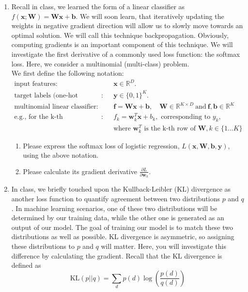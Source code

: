 \documentclass[a4paper]{article}
\begin{document}
\begin{enumerate}
\item Recall in class, we learned the form of a linear classifier as $f(\bm{x}; \bm{W}) =  \bm{W}\bm{x}+\bm{b}$. We will soon learn, that iteratively updating the weights in negative gradient direction will allow us to slowly move towards an optimal solution. We will call this technique backpropagation. Obviously, computing gradients is an important component of this technique. We will investigate the first derivative of a commonly used loss function: the softmax loss. Here, we consider a multinomial (multi-class) problem. \\
We first define the following notation:
\begin{align*}
	\text{input features}: & \quad \bm{x} \in \mathbb{R}^D.\\
	\text{target labels (one-hot encoded)}: & \quad \bm{y} \in \{0,1\}^K.\\
	\text{multinomial linear classifier}: & \quad \bm{f} = \bm{W}\bm{x} + \bm{b}, \quad \bm{W} \in \mathbb{R}^{K \times D}\ \text{and}\ \bm{f}, \bm{b} \in \mathbb{R}^K\\
	\text{e.g., for the k-th classification}: & \quad f_k = \bm{w}_k^T \bm{x} + b_k, \text{ corresponding to } y_k,\\
								&\quad \text{where } \bm{w}^T_k \text{ is the k-th row of } \bm{W}, k \in \{1...K\}  
\end{align*}
\begin{enumerate}
	\item Please express the softmax loss of logistic regression, $L(\bm{x}, \bm{W}, \bm{b}, \bm{y})$, using the above notation.
	\item Please calculate its gradient derivative $\frac{\partial L}{\partial \bm{w}_k}$.
\end{enumerate}

\item In class, we briefly touched upon the Kullback-Leibler (KL) divergence as another loss function to quantify agreement between two distributions $p$ and $q$. In machine learning scenarios, one of these two distributions will be determined by our training data, while the other one is generated as an output of our model. The goal of training our model is to match these two distributions as well as possible. KL divergence is asymmetric, so assigning these distributions to $p$ and $q$ will matter. Here, you will investigate this difference by calculating the gradient. Recall that the KL divergence is defined as 
\begin{equation}
	\text{KL}(p||q) = \sum_d p(d) \log \left( \frac{p(d)}{q(d)} \right) \nonumber
\end{equation}


\end{enumerate}
\end{document}

